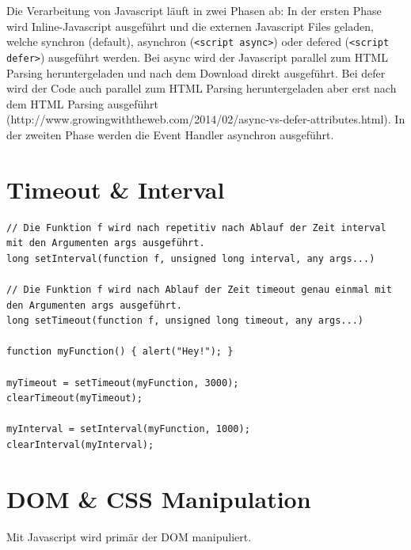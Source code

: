 Die Verarbeitung von Javascript läuft in zwei Phasen ab: In der ersten Phase wird Inline-Javascript ausgeführt und die externen Javascript Files geladen, welche synchron (default), asynchron (\lstinline|<script async>|) oder defered (\lstinline|<script defer>|) ausgeführt werden. Bei async wird der Javascript parallel zum HTML Parsing heruntergeladen und nach dem Download direkt ausgeführt. Bei defer wird der Code auch parallel zum HTML Parsing heruntergeladen aber erst nach dem HTML Parsing ausgeführt (http://www.growingwiththeweb.com/2014/02/async-vs-defer-attributes.html). In der zweiten Phase werden die Event Handler asynchron ausgeführt. 

\section{Timeout \& Interval}
\begin{lstlisting}[label=lst:timeout-interval,caption=Timeout \& Interval]
// Die Funktion f wird nach repetitiv nach Ablauf der Zeit interval mit den Argumenten args ausgeführt.
long setInterval(function f, unsigned long interval, any args...)

// Die Funktion f wird nach Ablauf der Zeit timeout genau einmal mit den Argumenten args ausgeführt.
long setTimeout(function f, unsigned long timeout, any args...)

function myFunction() { alert("Hey!"); }

myTimeout = setTimeout(myFunction, 3000);
clearTimeout(myTimeout);

myInterval = setInterval(myFunction, 1000);
clearInterval(myInterval);
\end{lstlisting}

\section{DOM \& CSS Manipulation}
Mit Javascript wird primär der DOM manipuliert. 

